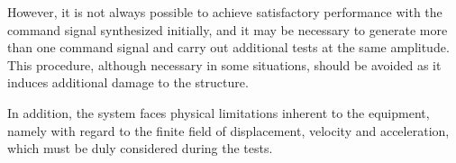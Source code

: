 \documentclass[  10pt, twoside]{report} %
\numberwithin{equation}{chapter}
\begin{document}
However, it is not always possible to achieve satisfactory performance with the command signal synthesized initially, and it may be necessary to generate more than one command signal and carry out additional tests at the same amplitude. This procedure, although necessary in some situations, should be avoided as it induces additional damage to the structure.

In addition, the system faces physical limitations inherent to the equipment, namely with regard to the finite field of displacement, velocity and acceleration, which must be duly considered during the tests.











\end{document}
